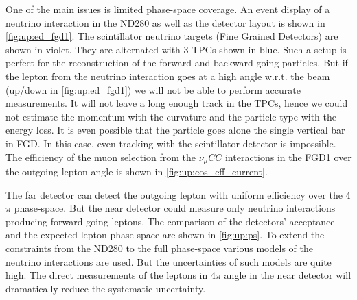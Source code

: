 \documentclass[../main.tex]{subfiles}
\begin{document}
One of the main issues is limited phase-space coverage. An event display of a neutrino interaction in the ND280 as well as the detector layout is shown in \autoref{fig:up:ed_fgd1}. The scintillator neutrino targets (Fine Grained Detectors) are shown in violet. They are alternated with 3 TPCs shown in blue. Such a setup is perfect for the reconstruction of the forward and backward going particles. But if the lepton from the neutrino interaction goes at a high angle w.r.t. the beam (up/down in \autoref{fig:up:ed_fgd1}) we will not be able to perform accurate measurements. It will not leave a long enough track in the TPCs, hence we could not estimate the momentum with the curvature and the particle type with the energy loss. It is even possible that the particle goes alone the single vertical bar in FGD. In this case, even tracking with the scintillator detector is impossible. The efficiency of the muon selection from the $\nu_\mu CC$ interactions in the FGD1 over the outgoing lepton angle is shown in \autoref{fig:up:cos_eff_current}.

The far detector can detect the outgoing lepton with uniform efficiency over the 4$\pi$ phase-space. But the near detector could measure only neutrino interactions producing forward going leptons. The comparison of the detectors' acceptance and the expected lepton phase space are shown in \autoref{fig:up:ps}. To extend the constraints from the ND280 to the full phase-space various models of the neutrino interactions are used. But the uncertainties of such models are quite high. The direct measurements of the leptons in 4$\pi$ angle in the near detector will dramatically reduce the systematic uncertainty.
\end{document}
